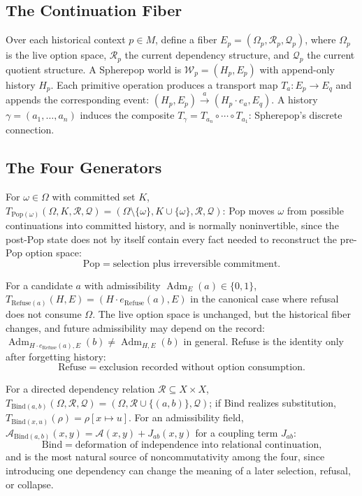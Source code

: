 \documentclass[11pt]{article}
\newcommand{\Adm}{\operatorname{Adm}}
\newcommand{\Pop}{\mathrm{Pop}}
\newcommand{\Refuse}{\mathrm{Refuse}}
\newcommand{\Bind}{\mathrm{Bind}}
\begin{document}
\subsection{The Continuation Fiber}

Over each historical context $p \in M$, define a fiber $E_p = (\Omega_p, \mathcal{R}_p, \mathcal{Q}_p)$, where $\Omega_p$ is the live option space, $\mathcal{R}_p$ the current dependency structure, and $\mathcal{Q}_p$ the current quotient structure. A Spherepop world is $\mathcal{W}_p = (H_p, E_p)$ with append-only history $H_p$. Each primitive operation produces a transport map $T_a : E_p \to E_q$ and appends the corresponding event: $(H_p, E_p) \xrightarrow{a} (H_p \cdot e_a, E_q)$. A history $\gamma = (a_1, \ldots, a_n)$ induces the composite $T_\gamma = T_{a_n} \circ \cdots \circ T_{a_1}$: Spherepop's discrete connection.

\subsection{The Four Generators}

For $\omega \in \Omega$ with committed set $K$, $T_{\Pop(\omega)}(\Omega, K, \mathcal{R}, \mathcal{Q}) = (\Omega \setminus \{\omega\}, K \cup \{\omega\}, \mathcal{R}, \mathcal{Q})$: Pop moves $\omega$ from possible continuations into committed history, and is normally noninvertible, since the post-Pop state does not by itself contain every fact needed to reconstruct the pre-Pop option space:
\[
\Pop = \text{selection plus irreversible commitment.}
\]

For a candidate $a$ with admissibility $\Adm_E(a) \in \{0,1\}$, $T_{\Refuse(a)}(H, E) = (H \cdot e_{\Refuse}(a), E)$ in the canonical case where refusal does not consume $\Omega$. The live option space is unchanged, but the historical fiber changes, and future admissibility may depend on the record: $\Adm_{H \cdot e_{\Refuse}(a), E}(b) \neq \Adm_{H,E}(b)$ in general. Refuse is the identity only after forgetting history:
\[
\Refuse = \text{exclusion recorded without option consumption.}
\]

For a directed dependency relation $\mathcal{R} \subseteq X \times X$, $T_{\Bind(a,b)}(\Omega, \mathcal{R}, \mathcal{Q}) = (\Omega, \mathcal{R} \cup \{(a,b)\}, \mathcal{Q})$; if Bind realizes substitution, $T_{\Bind(x,u)}(\rho) = \rho[x \mapsto u]$. For an admissibility field, $\mathcal{A}_{\Bind(a,b)}(x,y) = \mathcal{A}(x,y) + J_{ab}(x,y)$ for a coupling term $J_{ab}$:
\[
\Bind = \text{deformation of independence into relational continuation,}
\]
and is the most natural source of noncommutativity among the four, since introducing one dependency can change the meaning of a later selection, refusal, or collapse.
\end{document}
